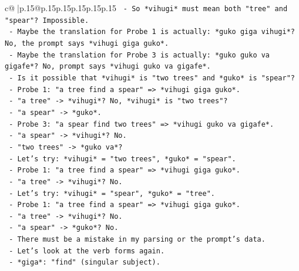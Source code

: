 \documentclass{article}
\begin{document}
{\begin{supertabular}{c@{$\;$}|p{.15\linewidth}@{}p{.15\linewidth}p{.15\linewidth}p{.15\linewidth}p{.15\linewidth}p{.15\linewidth}}
{{{\texttt{                      {-} So *vihugi* must mean both "tree" and "spear"? Impossible.} \\
\texttt{                      {-} Maybe the translation for Probe 1 is actually: *guko giga vihugi*? No, the prompt says *vihugi giga guko*.} \\
\texttt{                      {-} Maybe the translation for Probe 3 is actually: *guko guko va gigafe*? No, prompt says *vihugi guko va gigafe*.} \\
\texttt{                      {-} Is it possible that *vihugi* is "two trees" and *guko* is "spear"?} \\
\texttt{                        {-} Probe 1: "a tree find a spear" => *vihugi giga guko*.} \\
\texttt{                          {-} "a tree" {-}> *vihugi*? No, *vihugi* is "two trees"?} \\
\texttt{                          {-} "a spear" {-}> *guko*.} \\
\texttt{                        {-} Probe 3: "a spear find two trees" => *vihugi guko va gigafe*.} \\
\texttt{                          {-} "a spear" {-}> *vihugi*? No.} \\
\texttt{                          {-} "two trees" {-}> *guko va*?} \\
\texttt{                      {-} Let's try: *vihugi* = "two trees", *guko* = "spear".} \\
\texttt{                        {-} Probe 1: "a tree find a spear" => *vihugi giga guko*.} \\
\texttt{                          {-} "a tree" {-}> *vihugi*? No.} \\
\texttt{                      {-} Let's try: *vihugi* = "spear", *guko* = "tree".} \\
\texttt{                        {-} Probe 1: "a tree find a spear" => *vihugi giga guko*.} \\
\texttt{                          {-} "a tree" {-}> *vihugi*? No.} \\
\texttt{                          {-} "a spear" {-}> *guko*? No.} \\
\texttt{                      {-} There must be a mistake in my parsing or the prompt's data.} \\
\texttt{                      {-} Let's look at the verb forms again.} \\
\texttt{                        {-} *giga*: "find" (singular subject).} \\
}}}
\end{supertabular}}
\end{document}
